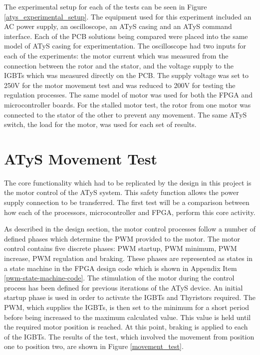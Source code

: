 The experimental setup for each of the tests can be seen in Figure \ref{atys_experimental_setup}. The equipment used for this experiment included an AC power supply, an oscilloscope, an ATyS casing and an ATyS command interface. Each of the PCB solutions being compared were placed into the same model of ATyS casing for experimentation. The oscilloscope had two inputs for each of the experiments: the motor current which was measured from the connection between the rotor and the stator, and the voltage supply to the IGBTs which was measured directly on the PCB. The supply voltage was set to 250V for the motor movement test and was reduced to 200V for testing the regulation processes. The same model of motor was used for both the FPGA and microcontroller boards. For the stalled motor test, the rotor from one motor was connected to the stator of the other to prevent any movement.
The same ATyS switch, the load for the motor, was used for each set of results. 

\section{ATyS Movement Test}
\label{atys-movement}

The core functionality which had to be replicated by the design in this project is the motor control of the ATyS system. This safety function allows the power supply connection to be transferred. The first test will be a comparison between how each of the processors, microcontroller and FPGA, perform this core activity. 

As described in the design section, the motor control processes follow a number of defined phases which determine the PWM provided to the motor. 
The motor control contains five discrete phases: PWM startup, PWM minimum, PWM increase, PWM regulation and braking. These phases are represented as states in a state machine in the FPGA design code which is shown in Appendix Item \ref{pwm-state-machine-code}. The stimulation of the motor during the control process has been defined for previous iterations of the ATyS device. An initial startup phase is used in order to activate the IGBTs and Thyristors required. The PWM, which supplies the IGBTs, is then set to the minimum for a short period before being increased to the maximum calculated value. This value is held until the required motor position is reached. At this point, braking is applied to each of the IGBTs. The results of the test, which involved the movement from position one to position two, are shown in Figure \ref{movement_test}.

